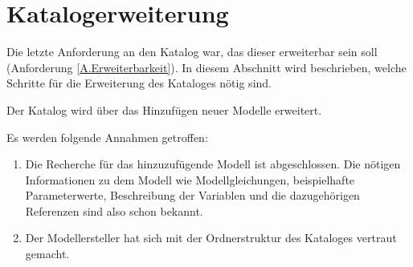\section{Katalogerweiterung}
\label{Ch:Ergebnisse:Sec:Erweiterung}
Die letzte Anforderung an den Katalog war, das dieser erweiterbar sein soll (Anforderung \ref{A.Erweiterbarkeit}). In diesem Abschnitt wird beschrieben, welche Schritte für die Erweiterung des Kataloges nötig sind. 

Der Katalog wird über das Hinzufügen neuer Modelle erweitert.

Es werden folgende Annahmen getroffen:
\begin{enumerate}
	\item Die Recherche für das hinzuzufügende Modell ist abgeschlossen. Die nötigen Informationen zu dem Modell wie Modellgleichungen, beispielhafte Parameterwerte, Beschreibung der Variablen und die dazugehörigen Referenzen sind also schon bekannt.
	\item Der Modellersteller hat sich mit der Ordnerstruktur des Kataloges vertraut gemacht.
\end{enumerate}

